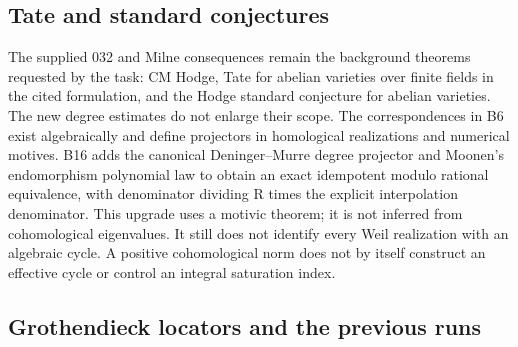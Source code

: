 \documentclass[11pt,a4paper]{article}
\theoremstyle{definition}
\begin{document}
\subsection{Tate and standard
conjectures}\label{IMPLICATIONS-tate-and-standard-conjectures}

The supplied 032 and Milne consequences remain the background theorems
requested by the task: CM Hodge, Tate for abelian varieties over finite
fields in the cited formulation, and the Hodge standard conjecture for
abelian varieties. The new degree estimates do not enlarge their scope.
The correspondences in B6 exist algebraically and define projectors in
homological realizations and numerical motives. B16 adds the canonical
Deninger--Murre degree projector and Moonen's endomorphism polynomial
law to obtain an exact idempotent modulo rational equivalence, with
denominator dividing R times the explicit interpolation denominator.
This upgrade uses a motivic theorem; it is not inferred from
cohomological eigenvalues. It still does not identify every Weil
realization with an algebraic cycle. A positive cohomological norm does
not by itself construct an effective cycle or control an integral
saturation index.

\subsection{Grothendieck locators and the previous
runs}\label{IMPLICATIONS-grothendieck-locators-and-the-previous-runs}
\end{document}
